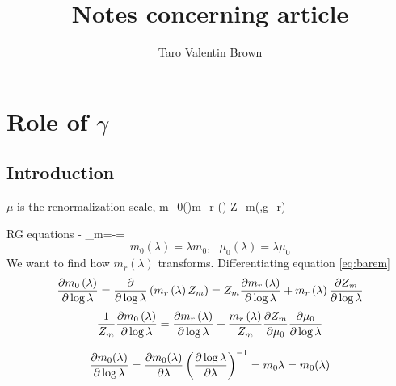 \documentclass[a4,10pt,titlepage]{article}
\begin{document}
	\title{\textbf{Notes concerning article}}
	\author{Taro Valentin Brown}
	\maketitle
	\section{Role of $\gamma$}
	\subsection{Introduction}
$\mu$ is the renormalization scale,
\be \label{eq:barem}
m_0\lp(\lambda \rp)\equiv m_r \lp(\lambda \rp) Z_m(\epsilon,g_r)
\ee

RG equations
\be \label{eq:gammam}
- \gamma_m\equiv {}=-=
\ee
\[
m_0(\lambda)=\lambda m_0,\:\:\:\mu_0(\lambda)=\lambda \mu_0
\]
We want to find how $m_r(\lambda)$ transforms. Differentiating equation \ref{eq:barem}
\[
\pdv{m_0\left(\lambda \right)}{\log \lambda}=\pdv{}{\log \lambda}\left(m_r\left(\lambda \right) Z_m\right)=Z_m\pdv{m_r \left(\lambda \right)}{\log \lambda}+m_r\left(\lambda \right)\pdv{Z_m}{\log \lambda}
\]
\[
\frac{1}{Z_m}\pdv{m_0\left(\lambda \right)}{\log \lambda}=\pdv{m_r\left(\lambda \right)}{\log \lambda}+\frac{m_r\left(\lambda \right)}{Z_m}\pdv{Z_m}{\mu_0}\pdv{\mu_0}{\log \lambda}
\]

\[
\pdv{m_0(\lambda)}{\log\lambda}=\pdv{m_0(\lambda)}{\lambda}\left(\pdv{\log \lambda}{\lambda} \right)^{-1}=m_0\lambda=m_0(\lambda)
\]
\end{document}
